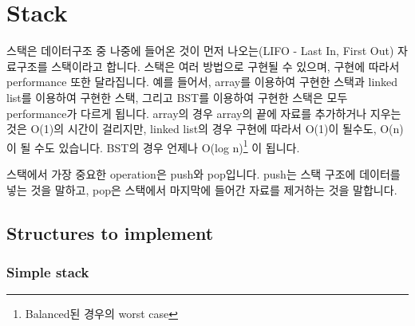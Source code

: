 \section{Stack}


스택은 데이터구조 중 나중에 들어온 것이 먼저 나오는(LIFO - Last In, First Out) 자료구조를 스택이라고 합니다. 스택은 여러 방법으로 구현될 수 있으며, 구현에 따라서 performance 또한 달라집니다. 예를 들어서, array를 이용하여 구현한 스택과 linked list를 이용하여 구현한 스택, 그리고 BST를 이용하여 구현한 스택은 모두 performance가 다르게 됩니다. array의 경우 array의 끝에 자료를 추가하거나 지우는 것은 O(1)의 시간이 걸리지만, linked list의 경우 구현에 따라서 O(1)이 될수도, O(n)이 될 수도 있습니다. BST의 경우 언제나 O(log n)\footnote{Balanced된 경우의 worst case} 이 됩니다. 

스택에서 가장 중요한 operation은 push와 pop입니다. push는 스택 구조에 데이터를 넣는 것을 말하고, pop은 스택에서 마지막에 들어간 자료를 제거하는 것을 말합니다. 

\subsection{Structures to implement}

\subsubsection{Simple stack}


